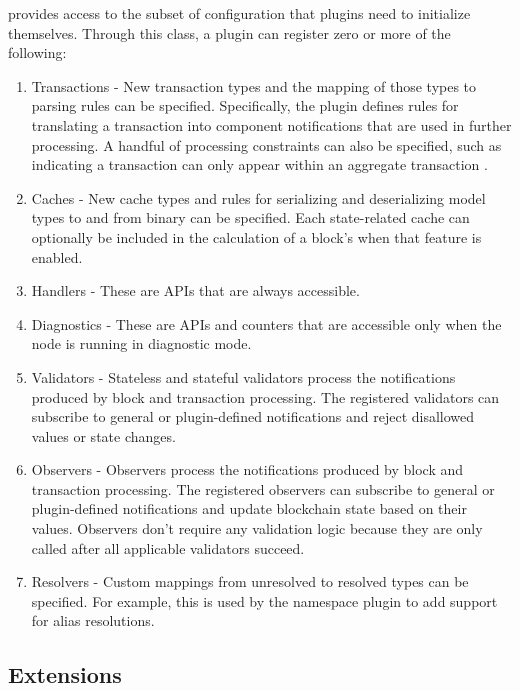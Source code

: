  provides access to the subset of configuration that plugins need to initialize themselves.
Through this class, a plugin can register zero or more of the following:

\begin{enumerate}
	\item{Transactions -
		New transaction types and the mapping of those types to parsing rules can be specified.
		Specifically, the plugin defines rules for translating a transaction into component notifications that are used in further processing.
		A handful of processing constraints can also be specified, such as indicating a transaction can only appear within an aggregate transaction .
	}
	\item{Caches -
		New cache types and rules for serializing and deserializing model types to and from binary can be specified.
		Each state-related cache can optionally be included in the calculation of a block's   when that feature is enabled.
	}
	\item{Handlers - These are APIs that are always accessible.}
	\item{Diagnostics - These are APIs and counters that are accessible only when the node is running in diagnostic mode.}
	\item{Validators -
		Stateless and stateful validators process the notifications produced by block and transaction processing.
		The registered validators can subscribe to general or plugin-defined notifications and reject disallowed values or state changes.
	}
	\item{Observers -
		Observers process the notifications produced by block and transaction processing.
		The registered observers can subscribe to general or plugin-defined notifications and update blockchain state based on their values.
		Observers don't require any validation logic because they are only called after all applicable validators succeed.
	}
	\item{Resolvers -
		Custom mappings from unresolved to resolved types can be specified.
		For example, this is used by the namespace plugin to add support for alias resolutions.
	}
\end{enumerate}

\subsection{\codenamespace Extensions}
\label{sec:system:extensions}

